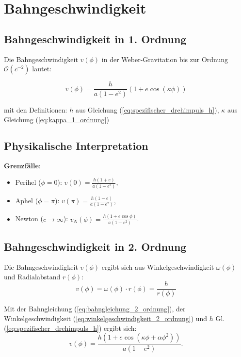 \section{Bahngeschwindigkeit}
\subsection{Bahngeschwindigkeit in 1. Ordnung}
Die Bahngeschwindigkeit \(v(\phi)\) in der Weber-Gravitation bis zur Ordnung \(\mathcal{O}(c^{-2})\) lautet:

\begin{equation}
    \boxed
    {
        v(\phi) = \frac{h}{a(1 - e^2)} \left(1 + e \cos\left(\kappa\phi\right)\right)   
    }
\end{equation}

\noindent mit den Definitionen:
$h$ aus Gleichung (\ref{eq:spezifischer_drehimpuls_h}), $\kappa$ aus Gleichung (\ref{eq:kappa_1_ordnung})

\subsection*{Physikalische Interpretation}
\textbf{Grenzfälle}:
\begin{itemize}
    \item Perihel (\(\phi = 0\)): \(v(0) = \frac{h(1 + e)}{a(1 - e^2)}\),
    \item Aphel (\(\phi = \pi\)): \(v(\pi) = \frac{h(1 - e)}{a(1 - e^2)}\),
    \item Newton (\(c \to \infty\)): \(v_N(\phi) = \frac{h(1 + e \cos\phi)}{a(1 - e^2)}\).
\end{itemize}

\subsection{Bahngeschwindigkeit in 2. Ordnung}
Die Bahngeschwindigkeit $v(\phi)$ ergibt sich aus Winkelgeschwindigkeit $\omega(\phi)$ und Radialabstand $r(\phi)$:
\[
v(\phi) = \omega(\phi) \cdot r(\phi) = \frac{h}{r(\phi)}
\]

Mit der Bahngleichung (\ref{eq:bahngleichung_2_ordnung}), der Winkelgeschwindigkeit (\ref{eq:winkelgeschwindigkeit_2_ordnung}) und $h$ Gl. (\ref{eq:spezifischer_drehimpuls_h}) ergibt sich:
\begin{equation}
    \boxed
    {
        v(\phi) = \frac{h \left(1 + e\cos(\kappa\phi + \alpha\phi^2)\right)}{a(1 - e^2)}.   
    }
\end{equation}
